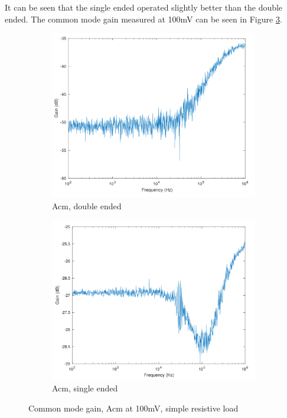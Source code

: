 It can be seen that the single ended operated slightly better than the double ended. The common mode gain measured at 100mV can be seen in Figure \ref{fig:Acmressimple}.

\begin{figure}[H]
    \centering
    \begin{subfigure}[b]{0.45\textwidth}
        \centering
        \includegraphics[width=\textwidth]{ExperimentalImplementation/Acm_resistive_double_ended_100m_simple.png}
        \caption{Acm, double ended}
        \label{fig:blue_led}
    \end{subfigure}
    \hfill
    \begin{subfigure}[b]{0.45\textwidth}
        \centering
        \includegraphics[width=\textwidth]{ExperimentalImplementation/Acm_resist_single_ended_100m_simple.png}
        \caption{Acm, single ended}
        \label{fig:blue_led}
    \end{subfigure}
    \caption{Common mode gain, Acm at 100mV, simple resistive load}
    \label{fig:Acmressimple}
\end{figure} 

